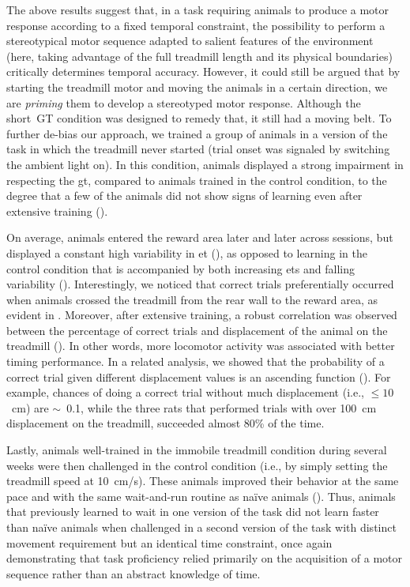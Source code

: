 The above results suggest that, in a task requiring animals to produce a motor response according to a fixed temporal constraint, the possibility to perform a stereotypical motor sequence adapted to salient features of the environment (here, taking advantage of the full treadmill length and its physical boundaries) critically determines temporal accuracy.
However, it could still be argued that by starting the treadmill motor and moving the animals in a certain direction, we are \textit{priming} them to develop a stereotyped motor response.
Although the short~GT condition was designed to remedy that, it still had a moving belt.
To further de-bias our approach, we trained a group of animals in a version of the task in which the treadmill never started (trial onset was signaled by switching the ambient light on).
In this condition, animals displayed a strong impairment in respecting the \gls{gt}, compared to animals trained in the control condition, to the degree that a few of the animals did not show signs of learning even after extensive training ().

On average, animals entered the reward area later and later across sessions, but displayed a constant high variability in \gls{et} (), as opposed to learning in the control condition that is accompanied by both increasing \glspl{et} and falling variability ().
Interestingly, we noticed that correct trials preferentially occurred when animals crossed the treadmill from the rear wall to the reward area, as evident in .
Moreover, after extensive training, a robust correlation was observed between the percentage of correct trials and displacement of the animal on the treadmill ().
In other words, more locomotor activity was associated with better timing performance.
In a related analysis, we showed that the probability of a correct trial given different displacement values is an ascending function ().
For example, chances of doing a correct trial without much displacement (i.e., $\leq 10$~cm) are $\sim$~0.1, while the three rats that performed trials with over 100~cm displacement on the treadmill, succeeded almost 80\% of the time.
\par
Lastly, animals well-trained in the immobile treadmill condition during several weeks were then challenged in the control condition (i.e., by simply setting the treadmill speed at 10~cm/s).
These animals improved their behavior at the same pace and with the same wait-and-run routine as na\"ive animals ().
Thus, animals that previously learned to wait in one version of the task did not learn faster than na\"ive animals when challenged in a second version of the task with distinct movement requirement but an identical time constraint, once again demonstrating that task proficiency relied primarily on the acquisition of a motor sequence rather than an abstract knowledge of time.